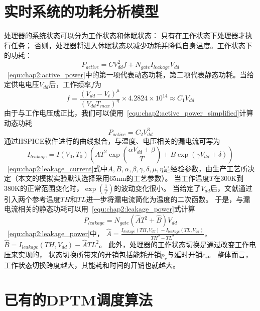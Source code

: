\section{实时系统的功耗分析模型}
\label{sec:power}
处理器的系统状态可以分为工作状态和休眠状态： 只有在工作状态下处理器才执行任务； 否则，处理器将进入休眠状态以减少功耗并降低自身温度。工作状态下的功耗：
\begin{equation}
\label{equ:chap2:active_power}
P_{active} = CV_{dd}^2f+N_{gate}I_{leakage}V_{dd}
\end{equation}
~\ref{equ:chap2:active_power}中的第一项代表动态功耗，第二项代表静态功耗。当给定供电电压$V_{dd}$后，工作频率$f$为
\begin{equation}
\label{equ:chap2:freq}
f = \frac{(V_{dd}-V_t)^\mu}{(V_{dd}T_{max})^\eta}\times 4.2824\times 10^{14} \approx C_1V_{dd}
\end{equation}
由于与工作电压成正比，我们可以使用~\ref{equ:chap2:active_power_simplified}计算动态功耗
\begin{equation}
\label{equ:chap2:active_power_simplified}
P_{active} = C_2V_{dd}^3
\end{equation}
通过HSPICE软件进行的曲线拟合，与温度、电压相关的漏电流可写为
\begin{equation}
\label{equ:chap2:leakage_current}
I_{leakage} = I(V_0,T_0)(AT^2\exp(\frac{\alpha V_{dd}+\beta}{T})+B\exp(\gamma V_{dd}+\delta))
\end{equation}
~\ref{equ:chap2:leakage_current}式中$A,B,\alpha,\beta,\gamma,\delta,\mu,\eta$是经验参数，由生产工艺所决定（本文的模拟实验默认选择采用65nm的工艺参数）。 当工作温度$T$在300K到380K的正常范围变化时，$\exp(\frac{1}{T})$的波动变化很小。 当给定了$V_{dd}$后，文献通过引入两个参考温度$TH$和$TL$进一步将漏电流简化为温度的二次函数。 于是，与漏电流相关的静态功耗可以用~\ref{equ:chap2:leakage_power}式计算
\begin{equation}
\label{equ:chap2:leakage_power}
P_{leakage} = N_{gate}(\hat{A}T^2+\hat{B})V_{dd}
\end{equation}
~\ref{equ:chap2:leakage_power}中，
$\hat{A}=\frac{I_{leakage}(TH,V_{dd})-I_{leakage}(TL,V_{dd})}{{TH}^2-{TL}^2}$，
$\hat{B}=I_{leakage}(TH,V_{dd})-\hat{A}{TL}^2$。
此外，处理器的工作状态切换是通过改变工作电压来实现的， 状态切换所带来的开销包括能耗开销$p_r$与延时开销$c_r$。 整体而言，工作状态切换跨度越大，其能耗和时间的开销也就越大。

\section{已有的DPTM调度算法}
\label{sec:algorithms}
